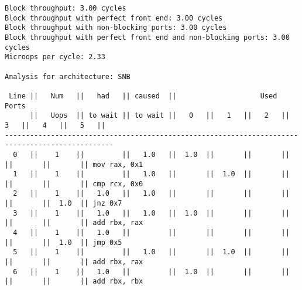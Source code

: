 \documentclass[a4paper,12pt,titlepage, twoside]{report}
\begin{document}
\begin{mdframed}[backgroundcolor=light-gray, roundcorner=10pt,leftmargin=1, rightmargin=1, innerleftmargin=15, innertopmargin=15,innerbottommargin=15, outerlinewidth=1, linecolor=light-gray]
\begin{center}
\begin{BVerbatim}[fontsize=\tiny]
Block throughput: 3.00 cycles
Block throughput with perfect front end: 3.00 cycles
Block throughput with non-blocking ports: 3.00 cycles
Block throughput with perfect front end and non-blocking ports: 3.00 cycles
Microops per cycle: 2.33

Analysis for architecture: SNB

 Line ||   Num   ||   had   || caused  ||                    Used Ports
      ||   Uops  || to wait || to wait ||   0   ||   1   ||   2   ||   3   ||   4   ||   5   ||
------------------------------------------------------------------------------------------------
  0   ||    1    ||         ||   1.0   ||  1.0  ||       ||       ||       ||       ||       || mov rax, 0x1
  1   ||    1    ||         ||   1.0   ||       ||  1.0  ||       ||       ||       ||       || cmp rcx, 0x0
  2   ||    1    ||   1.0   ||   1.0   ||       ||       ||       ||       ||       ||  1.0  || jnz 0x7
  3   ||    1    ||   1.0   ||   1.0   ||  1.0  ||       ||       ||       ||       ||       || add rbx, rax
  4   ||    1    ||   1.0   ||         ||       ||       ||       ||       ||       ||  1.0  || jmp 0x5
  5   ||    1    ||         ||   1.0   ||       ||  1.0  ||       ||       ||       ||       || add rbx, rax
  6   ||    1    ||   1.0   ||         ||  1.0  ||       ||       ||       ||       ||       || add rbx, rbx
\end{BVerbatim}
\end{center}
\end{mdframed}
\end{document}
